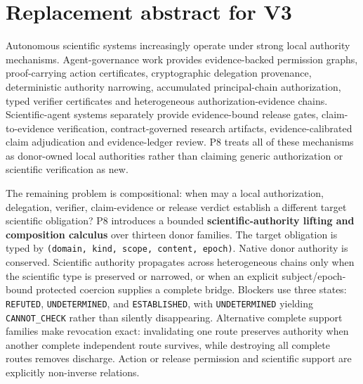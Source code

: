\section{Replacement abstract for V3}

Autonomous scientific systems increasingly operate under strong local authority mechanisms. Agent-governance work provides evidence-backed permission graphs, proof-carrying action certificates, cryptographic delegation provenance, deterministic authority narrowing, accumulated principal-chain authorization, typed verifier certificates and heterogeneous authorization-evidence chains. Scientific-agent systems separately provide evidence-bound release gates, claim-to-evidence verification, contract-governed research artifacts, evidence-calibrated claim adjudication and evidence-ledger review. P8 treats all of these mechanisms as donor-owned local authorities rather than claiming generic authorization or scientific verification as new.

The remaining problem is compositional: when may a local authorization, delegation, verifier, claim-evidence or release verdict establish a different target scientific obligation? P8 introduces a bounded \textbf{scientific-authority lifting and composition calculus} over thirteen donor families. The target obligation is typed by \texttt{(domain, kind, scope, content, epoch)}. Native donor authority is conserved. Scientific authority propagates across heterogeneous chains only when the scientific type is preserved or narrowed, or when an explicit subject/epoch-bound protected coercion supplies a complete bridge. Blockers use three states: \texttt{REFUTED}, \texttt{UNDETERMINED}, and \texttt{ESTABLISHED}, with \texttt{UNDETERMINED} yielding \texttt{CANNOT_CHECK} rather than silently disappearing. Alternative complete support families make revocation exact: invalidating one route preserves authority when another complete independent route survives, while destroying all complete routes removes discharge. Action or release permission and scientific support are explicitly non-inverse relations.

